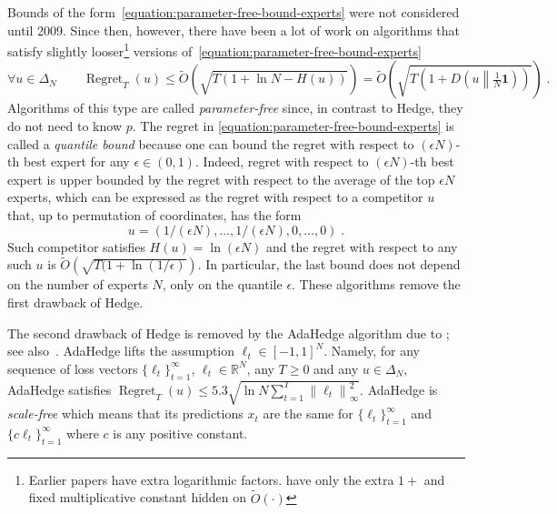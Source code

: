 \documentclass{colt2016} %
\DeclareMathOperator{\Regret}{Regret}
\newcommand{\R}{\mathbb{R}}     %
\newcommand{\KL}[2]{D\left({#1}\middle\|{#2}\right)}  %
\newcommand{\norm}[1]{\left\|{#1}\right\|}
\newcommand{\indicator}{\mathbf{1}}
\begin{document}
Bounds of the form~\eqref{equation:parameter-free-bound-experts} were not
considered until 2009. Since then, however, there have been a lot of work
\citep{Chaudhuri-Freund-Hsu-2009, Chernov-Vovk-2010, Koolen-van-Erven-2015,
Luo-Schapire-2014, Luo-Schapire-2015, Foster-Rakhlin-Sridharan-2015,
Orabona-Pal-2016-parameter-free} on algorithms that satisfy slightly
looser\footnote{Earlier papers have extra logarithmic factors.
\citet{Foster-Rakhlin-Sridharan-2015, Orabona-Pal-2016-parameter-free} have
only the extra $1+$ and fixed multiplicative constant hidden on $\widetilde
O(\cdot)$} versions of~\eqref{equation:parameter-free-bound-experts}
\begin{equation}
\label{equation:parameter-free-bound-experts-2}
\forall u \in \Delta_N \qquad \Regret_T(u) \le \widetilde O(\sqrt{T (1 + \ln N - H(u))}) = \widetilde O\left(\sqrt{T \left(1 + \KL{u}{\tfrac{1}{N}\indicator} \right)} \right) \; .
\end{equation}
Algorithms of this type are called \emph{parameter-free} since, in contrast to
Hedge, they do not need to know $p$. %
The regret in \eqref{equation:parameter-free-bound-experts} is called a \emph{quantile
bound} because one can bound the regret with
respect to $(\epsilon N)$-th best expert for any $\epsilon \in (0,1)$. Indeed,
regret with respect to $(\epsilon N)$-th best expert is upper bounded by the
regret with respect to the average of the top $\epsilon N$ experts, which can
be expressed as the regret with respect to a competitor $u$ that, up to
permutation of coordinates, has the form
$$
u = \left( 1/(\epsilon N), \dots, 1/(\epsilon N), 0, \dots, 0 \right) \; .
$$
Such competitor satisfies $H(u) = \ln (\epsilon N)$ and the regret with respect
to any such $u$ is $\widetilde O(\sqrt{T (1 + \ln(1/\epsilon)})$. In
particular, the last bound does not depend on the number of experts $N$, only
on the quantile $\epsilon$.  These algorithms remove the first drawback of
Hedge.

The second drawback of Hedge is removed by the AdaHedge algorithm due to
\cite{de-Rooij-van-Erven-Grunwald-Koolen-2014}; see
also~\citep{Orabona-Pal-2016-parameter-free}. AdaHedge lifts the assumption
$\ell_t \in [-1,1]^N$. Namely, for any sequence of loss vectors
$\{\ell_t\}_{t=1}^\infty$, $\ell_t \in \R^N$, any $T \ge 0$ and any $u \in
\Delta_N$, AdaHedge satisfies $\Regret_T(u) \le 5.3 \sqrt{\ln N \sum_{t=1}^T
\norm{\ell_t}_\infty^2}$. AdaHedge is \emph{scale-free} which means that its
predictions $x_t$ are the same for $\{\ell_t\}_{t=1}^\infty$ and $\{c
\ell_t\}_{t=1}^\infty$ where $c$ is any positive constant.
\end{document}
